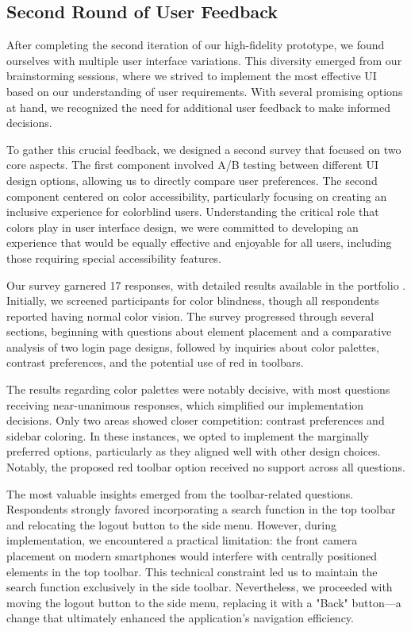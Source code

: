 \documentclass[sigconf,nonacm]{acmart}
\begin{document}
\subsection{Second Round of User Feedback}
After completing the second iteration of our high-fidelity prototype, we found ourselves with multiple user interface variations. This diversity emerged from our brainstorming sessions, where we strived to implement the most effective UI based on our understanding of user requirements. With several promising options at hand, we recognized the need for additional user feedback to make informed decisions.

To gather this crucial feedback, we designed a second survey \cite{anketa2} that focused on two core aspects. The first component involved A/B testing between different UI design options, allowing us to directly compare user preferences. The second component centered on color accessibility, particularly focusing on creating an inclusive experience for colorblind users. Understanding the critical role that colors play in user interface design, we were committed to developing an experience that would be equally effective and enjoyable for all users, including those requiring special accessibility features.

Our survey garnered 17 responses, with detailed results available in the portfolio \cite{anketa2-rez}. Initially, we screened participants for color blindness, though all respondents reported having normal color vision. The survey progressed through several sections, beginning with questions about element placement and a comparative analysis of two login page designs, followed by inquiries about color palettes, contrast preferences, and the potential use of red in toolbars.

The results regarding color palettes were notably decisive, with most questions receiving near-unanimous responses, which simplified our implementation decisions. Only two areas showed closer competition: contrast preferences and sidebar coloring. In these instances, we opted to implement the marginally preferred options, particularly as they aligned well with other design choices. Notably, the proposed red toolbar option received no support across all questions.

The most valuable insights emerged from the toolbar-related questions. Respondents strongly favored incorporating a search function in the top toolbar and relocating the logout button to the side menu. However, during implementation, we encountered a practical limitation: the front camera placement on modern smartphones would interfere with centrally positioned elements in the top toolbar. This technical constraint led us to maintain the search function exclusively in the side toolbar. Nevertheless, we proceeded with moving the logout button to the side menu, replacing it with a "Back" button—a change that ultimately enhanced the application's navigation efficiency.
\end{document}
